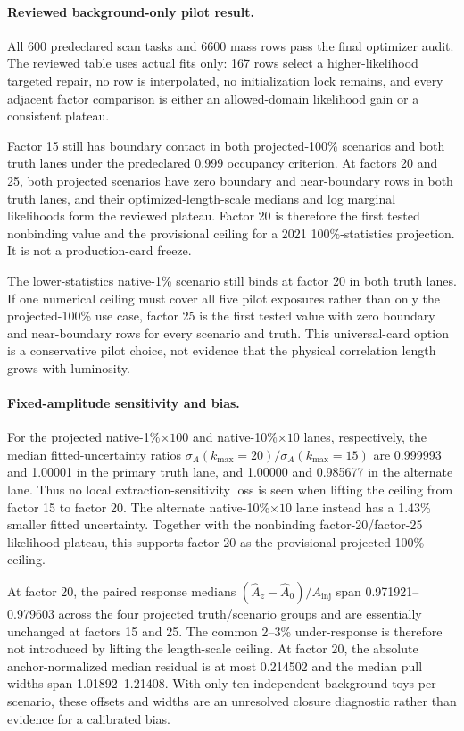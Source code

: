 {\paragraph{Reviewed background-only pilot result.}
All 600 predeclared scan tasks and 6600 mass rows pass the final optimizer audit.
The reviewed table uses actual fits only: 167 rows select a higher-likelihood targeted
repair, no row is interpolated, no initialization lock remains, and every adjacent
factor comparison is either an allowed-domain likelihood gain or a consistent
plateau.

Factor 15 still has boundary contact in both projected-100\% scenarios and both truth
lanes under the predeclared 0.999 occupancy criterion. At factors 20 and 25, both
projected scenarios have zero boundary and near-boundary rows in both truth lanes, and
their optimized-length-scale medians and log marginal likelihoods form the reviewed
plateau. Factor 20 is therefore the first tested nonbinding value and the provisional
ceiling for a 2021 100\%-statistics projection. It is not a production-card freeze.

The lower-statistics native-1\% scenario still binds at factor 20 in both truth lanes.
If one numerical ceiling must cover all five pilot exposures rather than only the
projected-100\% use case, factor 25 is the first tested value with zero boundary and
near-boundary rows for every scenario and truth. This universal-card option is a
conservative pilot choice, not evidence that the physical correlation length grows
with luminosity.

\paragraph{Fixed-amplitude sensitivity and bias.}
For the projected native-1\%$\times100$ and native-10\%$\times10$ lanes, respectively,
the median fitted-uncertainty ratios
$\sigma_A(k_{\max}=20)/\sigma_A(k_{\max}=15)$ are 0.999993 and 1.00001 in the
primary truth lane, and 1.00000 and 0.985677 in the alternate lane. Thus no local
extraction-sensitivity loss is seen when lifting the ceiling from factor 15 to factor
20. The alternate native-10\%$\times10$ lane instead has a 1.43\% smaller fitted
uncertainty. Together with the nonbinding factor-20/factor-25 likelihood plateau, this
supports factor 20 as the provisional projected-100\% ceiling.

At factor 20, the paired response medians
$(\hat A_z-\hat A_0)/A_{\mathrm{inj}}$ span 0.971921--0.979603 across the four
projected truth/scenario groups and are essentially unchanged at factors 15 and 25.
The common 2--3\% under-response is therefore not introduced by lifting the
length-scale ceiling. At factor 20, the absolute anchor-normalized median residual is
at most 0.214502 and the median pull widths span 1.01892--1.21408. With only ten
independent background toys per scenario, these offsets and widths are an unresolved
closure diagnostic rather than evidence for a calibrated bias.

}
